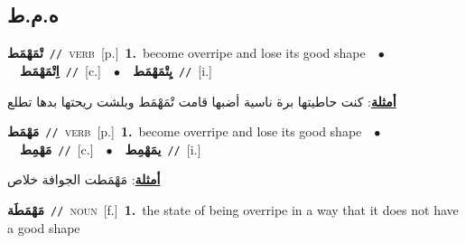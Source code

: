 \documentclass[10pt,a4paper,twoside]{article} %
\begin{document}
\begin{multicols}{2}
\vspace{-3mm}
\subsection*{\color{blue}\foreignlanguage{arabic}{ه.م.ط}\color{blue}{}} 

{\setlength\topsep{0pt}\textbf{\foreignlanguage{arabic}{تْمَهْمَط}}\ {\color{gray}\texttt{//}\color{black}}\ \textsc{verb}\ [p.]\ \textbf{1.}~become overripe and lose its good shape\ \ $\bullet$\ \ \setlength\topsep{0pt}\textbf{\foreignlanguage{arabic}{اِتْمَهْمَط}}\ {\color{gray}\texttt{//}\color{black}}\ [c.]\ \ $\bullet$\ \ \setlength\topsep{0pt}\textbf{\foreignlanguage{arabic}{يِتْمَهْمَط}}\ {\color{gray}\texttt{//}\color{black}}\ [i.]\  \begin{flushright}\color{gray}\foreignlanguage{arabic}{\textbf{\underline{\foreignlanguage{arabic}{أمثلة}}}: كنت حاطيتها برة ناسية أضبها قامت تْمَهْمَط وبلشت ريحتها بدها تطلع}\end{flushright}\color{black}} \vspace{2mm}

{\setlength\topsep{0pt}\textbf{\foreignlanguage{arabic}{مَهْمَط}}\ {\color{gray}\texttt{//}\color{black}}\ \textsc{verb}\ [p.]\ \textbf{1.}~become overripe and lose its good shape\ \ $\bullet$\ \ \setlength\topsep{0pt}\textbf{\foreignlanguage{arabic}{مَهْمِط}}\ {\color{gray}\texttt{//}\color{black}}\ [c.]\ \ $\bullet$\ \ \setlength\topsep{0pt}\textbf{\foreignlanguage{arabic}{يمَهْمِط}}\ {\color{gray}\texttt{//}\color{black}}\ [i.]\  \begin{flushright}\color{gray}\foreignlanguage{arabic}{\textbf{\underline{\foreignlanguage{arabic}{أمثلة}}}: مَهْمَطت الجوافة خلاص}\end{flushright}\color{black}} \vspace{2mm}

{\setlength\topsep{0pt}\textbf{\foreignlanguage{arabic}{مَهْمَطَة}}\ {\color{gray}\texttt{//}\color{black}}\ \textsc{noun}\ [f.]\ \textbf{1.}~the state of being overripe in a way that it does not have a good shape\ } \vspace{2mm}


\end{multicols}
\end{document}

